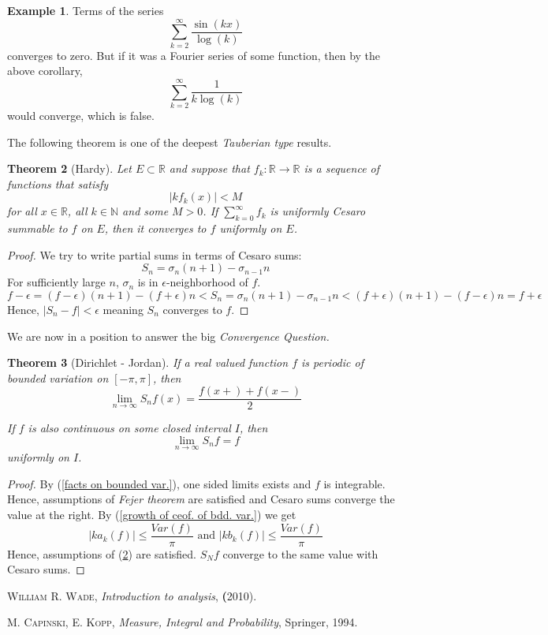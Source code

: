 \documentclass[12pt]{amsart}
\newtheorem{theorem}{Theorem}[section]
\theoremstyle{definition}
\newtheorem{example}[theorem]{Example}
\newcommand{\NN}{{\mathbb N}} %
\newcommand{\RR}{{\mathbb R}} %
\begin{document}
\begin{example}
    Terms of the series
    \[
    \sum_{k=2}^{\infty}\frac{\sin(kx)}{\log(k)}
    \]
    converges to zero. But if it was a Fourier series of some function, then by the above corollary,
    \[
    \sum_{k=2}^{\infty}\frac{1}{k\log(k)}
    \]
    would converge, which is false.
\end{example}


The following theorem is one of the deepest \emph{Tauberian type} results.


\begin{theorem}[Hardy]\label{Hardy}
    Let $E \subset \RR$ and suppose that $f_k: \RR \to \RR$ is a sequence of functions that satisfy
    \[
    |kf_k(x)| < M
    \]
    for all $x \in \RR$, all $k \in \NN$ and some $M > 0$. If $\sum_{k=0}^{\infty}f_k$ is uniformly Cesaro summable to $f$ on $E$,
    then it converges to $f$ uniformly on $E$.
\end{theorem}


\begin{proof}




    We try to write partial sums in terms of Cesaro sums:
    \[
    S_n = \sigma_n (n+1) - \sigma_{n-1} n
    \]
    For sufficiently large $n$, $\sigma_n$ is in $\epsilon$-neighborhood of $f$.
    \[
  f - \epsilon = (f-\epsilon)(n+1) -  (f+\epsilon)n < S_n = \sigma_n (n+1) - \sigma_{n-1} n < (f+\epsilon)(n+1) -  (f-\epsilon)n =  f + \epsilon
    \]
    Hence, $|S_n - f| < \epsilon$ meaning $S_n$ converges to $f$.
\end{proof}


We are now in a position to answer the big \emph{Convergence Question.}

\begin{theorem}[Dirichlet - Jordan]
    If a real valued function $f$ is periodic of bounded variation on $[-\pi,\pi]$, then
    \[
    \lim_{n \to \infty}S_nf(x) = \frac{f(x+) + f(x-)}{2}
    \]

    If $f$ is also continuous on some closed interval $I$, then
    \[
    \lim_{n \to \infty}S_nf = f
    \]
    uniformly on $I$.
\end{theorem}


\begin{proof}
    By (\ref{facts on bounded var.}), one sided limits exists and $f$ is integrable. Hence, assumptions of \emph{Fejer theorem} are satisfied and Cesaro sums converge the value at the right. By (\ref{growth of ceof. of bdd. var.}) we get
    \[
    |ka_k(f)|\leq \frac{Var(f)}{\pi}  \text{ and }  |kb_k(f)| \leq \frac{Var(f)}{\pi}
    \]
    Hence, assumptions of (\ref{Hardy}) are satisfied. $S_Nf$ converge to the same value with Cesaro sums.
\end{proof}








\begin{thebibliography}{99}

 \textsc{William R. Wade},  \textit{Introduction to analysis}, \textbf(2010).

 \textsc{M. Capinski, E. Kopp}, \textit{Measure, Integral and Probability}, Springer,
 1994.

\end{thebibliography}
\end{document}
